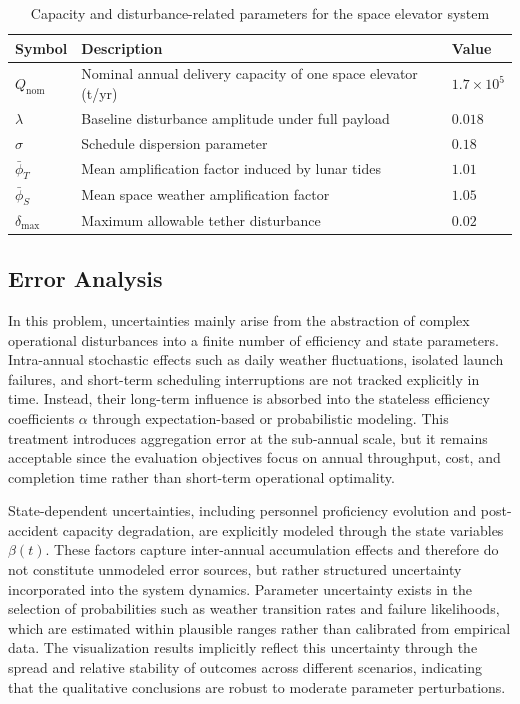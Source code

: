 \documentclass[12pt]{article}
\begin{document}
\begin{table}[htbp]
\centering
\renewcommand{\arraystretch}{1.2}
\begin{tabular}{lll}
\hline
Symbol & Description & Value \\
\hline
$Q_{\mathrm{nom}}$     & Nominal annual delivery capacity of one space elevator (t/yr) & $1.7 \times 10^{5}$ \\
$\lambda$              & Baseline disturbance amplitude under full payload              & $0.018$ \\
$\sigma$               & Schedule dispersion parameter                                   & $0.18$ \\
$\bar{\phi}_T$         & Mean amplification factor induced by lunar tides                & $1.01$ \\
$\bar{\phi}_S$         & Mean space weather amplification factor                          & $1.05$ \\
$\delta_{\max}$        & Maximum allowable tether disturbance                             & $0.02$ \\
\hline
\end{tabular}
\caption{Capacity and disturbance-related parameters for the space elevator system}
\label{tab:se_disturbance_parameters}
\end{table}

\subsection{Error Analysis}

In this problem, uncertainties mainly arise from the abstraction of complex operational disturbances into a finite number of efficiency and state parameters. Intra-annual stochastic effects such as daily weather fluctuations, isolated launch failures, and short-term scheduling interruptions are not tracked explicitly in time. Instead, their long-term influence is absorbed into the stateless efficiency coefficients $\alpha$ through expectation-based or probabilistic modeling. This treatment introduces aggregation error at the sub-annual scale, but it remains acceptable since the evaluation objectives focus on annual throughput, cost, and completion time rather than short-term operational optimality.

State-dependent uncertainties, including personnel proficiency evolution and post-accident capacity degradation, are explicitly modeled through the state variables $\beta(t)$. These factors capture inter-annual accumulation effects and therefore do not constitute unmodeled error sources, but rather structured uncertainty incorporated into the system dynamics. Parameter uncertainty exists in the selection of probabilities such as weather transition rates and failure likelihoods, which are estimated within plausible ranges rather than calibrated from empirical data. The visualization results implicitly reflect this uncertainty through the spread and relative stability of outcomes across different scenarios, indicating that the qualitative conclusions are robust to moderate parameter perturbations.
\end{document}
